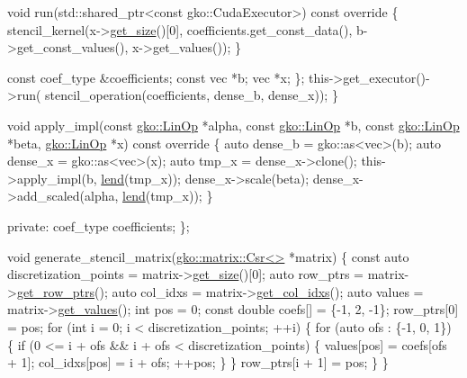 \begin{DoxyCodeInclude}
            \textcolor{keywordtype}{void} run(std::shared\_ptr<const gko::CudaExecutor>)\textcolor{keyword}{ const override}
\textcolor{keyword}{            }\{
                stencil\_kernel(x->\hyperlink{classgko_1_1LinOp_a31b3c003388eb0b95393154f68c2b98d}{get\_size}()[0], coefficients.get\_const\_data(),
                               b->get\_const\_values(), x->get\_values());
            \}


            \textcolor{keyword}{const} coef\_type &coefficients;
            \textcolor{keyword}{const} vec *b;
            vec *x;
        \};
        this->get\_executor()->run(
            stencil\_operation(coefficients, dense\_b, dense\_x));
    \}

    \textcolor{keywordtype}{void} apply\_impl(\textcolor{keyword}{const} \hyperlink{classgko_1_1LinOp}{gko::LinOp} *alpha, \textcolor{keyword}{const} \hyperlink{classgko_1_1LinOp}{gko::LinOp} *b,
                    \textcolor{keyword}{const} \hyperlink{classgko_1_1LinOp}{gko::LinOp} *beta, \hyperlink{classgko_1_1LinOp}{gko::LinOp} *x)\textcolor{keyword}{ const override}
\textcolor{keyword}{    }\{
        \textcolor{keyword}{auto} dense\_b = gko::as<vec>(b);
        \textcolor{keyword}{auto} dense\_x = gko::as<vec>(x);
        \textcolor{keyword}{auto} tmp\_x = dense\_x->clone();
        this->apply\_impl(b, \hyperlink{namespacegko_aa8cb4876b72e5e1036ea9575443c439b}{lend}(tmp\_x));
        dense\_x->scale(beta);
        dense\_x->add\_scaled(alpha, \hyperlink{namespacegko_aa8cb4876b72e5e1036ea9575443c439b}{lend}(tmp\_x));
    \}

\textcolor{keyword}{private}:
    coef\_type coefficients;
\};


\textcolor{keywordtype}{void} generate\_stencil\_matrix(\hyperlink{classgko_1_1matrix_1_1Csr}{gko::matrix::Csr<>} *matrix)
\{
    \textcolor{keyword}{const} \textcolor{keyword}{auto} discretization\_points = matrix->\hyperlink{classgko_1_1LinOp_a31b3c003388eb0b95393154f68c2b98d}{get\_size}()[0];
    \textcolor{keyword}{auto} row\_ptrs = matrix->\hyperlink{classgko_1_1matrix_1_1Csr_a068e5158cf282fa977f0a137f8cd7f03}{get\_row\_ptrs}();
    \textcolor{keyword}{auto} col\_idxs = matrix->\hyperlink{classgko_1_1matrix_1_1Csr_a81c6294177a1be4873804c8a85a9fc64}{get\_col\_idxs}();
    \textcolor{keyword}{auto} values = matrix->\hyperlink{classgko_1_1matrix_1_1Csr_a929b0a194e6aeb1252b8e6781d162e83}{get\_values}();
    \textcolor{keywordtype}{int} pos = 0;
    \textcolor{keyword}{const} \textcolor{keywordtype}{double} coefs[] = \{-1, 2, -1\};
    row\_ptrs[0] = pos;
    \textcolor{keywordflow}{for} (\textcolor{keywordtype}{int} i = 0; i < discretization\_points; ++i) \{
        \textcolor{keywordflow}{for} (\textcolor{keyword}{auto} ofs : \{-1, 0, 1\}) \{
            \textcolor{keywordflow}{if} (0 <= i + ofs && i + ofs < discretization\_points) \{
                values[pos] = coefs[ofs + 1];
                col\_idxs[pos] = i + ofs;
                ++pos;
            \}
        \}
        row\_ptrs[i + 1] = pos;
    \}
\}



\end{DoxyCodeInclude}
